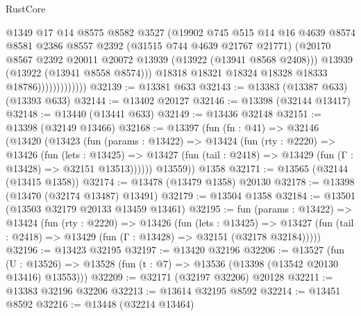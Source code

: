 \begin{lexlean}{RustCore}
\begin{coremodule}
                              @1349
                              @17
                              @14
                              @8575
                              @8582
                              @3527
                              (@19902
                                @745
                                @515
                                @14
                                @16
                                @4639
                                @8574
                                @8581
                                @2386
                                @8557
                                @2392
                                (@31515 @744 @4639 @21767 @21771)
                                (@20170
                                  @8567
                                  @2392
                                  @20011
                                  @20072
                                  @13939
                                  (@13922 (@13941 @8568 @2408)))
                                @13939
                                (@13922 (@13941 @8558 @8574)))
                              @18318
                              @18321
                              @18324
                              @18328
                              @18333
                              @18786)))))))))))))
@32139 := @13381 @633
@32143 := @13383 (@13387 @633) (@13393 @633)
@32144 := @13402 @20127
@32146 := @13398 (@32144 @13417)
@32148 := @13440 (@13441 @633)
@32149 := @13436 @32148
@32151 := @13398 (@32149 @13466)
@32168 := @13397
    (fun (fn : @41) =>
    @32146
      (@13420
        (@13423
          (fun (params : @13422) =>
          @13424
            (fun (rty : @2220) =>
            @13426
              (fun (lets : @13425) =>
              @13427 (fun (tail : @2418) => @13429 (fun (Γ : @13428) => @32151 @13513))))))
        @13559))
    @1358
@32171 := @13565 (@32144 (@13415 @1358))
@32174 := @13478 (@13479 @1358) @20130
@32178 := @13398 (@13470 (@32174 @13487) @13491)
@32179 := @13504 @1358
@32184 := @13501 (@13503 @32179 @20133 @13459 @13461)
@32195 := fun (params : @13422) =>
  @13424
    (fun (rty : @2220) =>
    @13426
      (fun (lets : @13425) =>
      @13427 (fun (tail : @2418) => @13429 (fun (Γ : @13428) => @32151 (@32178 @32184)))))
@32196 := @13423 @32195
@32197 := @13420 @32196
@32206 := @13527
    (fun (U : @13526) => @13528 (fun (t : @7) => @13536 (@13398 (@13542 @20130 @13416) @13553)))
@32209 := @32171 (@32197 @32206) @20128
@32211 := @13383 @32196 @32206
@32213 := @13614 @32195 @8592
@32214 := @13451 @8592
@32216 := @13448 (@32214 @13464)

\end{coremodule}
\end{lexlean}
